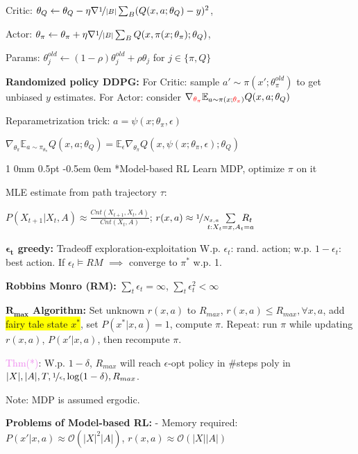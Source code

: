 \documentclass[11pt,landscape,a4paper,fleqn]{article}
\makeatletter
\newcommand*{\rsection}{%
	\@startsection{section}%
	{1}%
	{0mm}%
	{0.5pt}%
	{-0.5em \@plus 0em}
	{\color{myorange}\sffamily\small\bfseries}}
\newcommand{\mhl}[1]{\setlength{\fboxsep}{0pt}\colorbox{yellow}{#1}}
\makeatother
\begin{document}
\begin{multicols*}{4}
\iftrue
Critic: $\theta_Q \leftarrow \theta_Q - \eta \nabla \nicefrac{1}{|B|} \sum_B (Q(x,a;\theta_Q) - y)^2$,

Actor: $\theta_\pi  \leftarrow \theta_\pi + \eta \nabla \nicefrac{1}{|B|} \sum_B Q(x, \pi(x; \theta_\pi); \theta_Q)$,

Params: $\theta_j^{old} \leftarrow (1 - \rho) \theta_j^{old} + \rho \theta_j$ for $j \in \{\pi, Q \}$
\fi


\textbf{Randomized policy DDPG:} For Critic: sample $a' \sim \pi(x'; \theta_\pi^{old})$ to get unbiased $y$ estimates. For Actor: consider $\nabla_{\textcolor{red}{\theta_\pi}} \mathbb{E}_{a \sim \pi(x; \textcolor{red}{\theta_\pi})} Q(x,a;\theta_Q)$

Reparametrization trick: $a = \psi(x; \theta_\pi, \epsilon)$

$\nabla_{\theta_\pi} \mathbb{E}_{a \sim \pi_{\theta_\pi}} Q(x,a;\theta_Q) = \mathbb{E}_\epsilon \nabla_{\theta_\pi} Q(x, \psi(x; \theta_\pi, \epsilon); \theta_Q)$

\rsection*{Model-based RL} {\fontsize{9.5}{6}\selectfont Learn MDP, optimize $\pi$ on it}

MLE estimate from path trajectory $\tau$:

{\fontsize{9.7}{6}\selectfont $P(X_{t+1} | X_t, A) \approx \frac{Cnt(X_{t+1}, X_t, A)}{Cnt(X_t, A)}$;
$r(x,a) \approx \nicefrac{1}{N_{x,a}} \hspace*{-5mm} \sum\limits_{t: X_t = x, A_t = a} \hspace*{-5mm} R_t$}

\textbf{$\mathbf{\epsilon_t}$ greedy:} Tradeoff exploration-exploitation
W.p. $\epsilon_t$: rand. action; w.p. $1 - \epsilon_t$: best action.
If $\epsilon_t \vDash RM$ $\implies$ converge to $\pi^*$ w.p. 1.

\textbf{Robbins Monro (RM):} $\sum_t \epsilon_t = \infty$, $\sum_t \epsilon_t^2 < \infty$

\textbf{$\mathbf{R_{max}}$ Algorithm:} Set unknown $r(x,a)$ to $R_{max}$, $r(x,a) \leq R_{max}, \forall x,a$, add \mhl{fairy tale state $x^*$}, set $P(x^* | x,a) = 1$, compute $\pi$. Repeat: run $\pi$ while updating $r(x,a)$, $P(x' | x,a)$, then recompute $\pi$.

\textcolor{violet}{Thm(*)}: W.p. $1 - \delta$, $R_{max}$ will reach $\epsilon$-opt policy in \#steps poly in $|X|, |A|, T, \nicefrac{1}{\epsilon}, \log(1 - \delta), R_{max}$.

Note: MDP is assumed ergodic.

\textbf{Problems of Model-based RL:} - Memory required: $P(x'|x,a) \approx \mathcal{O}(|X|^2 |A|)$, $r(x,a) \approx \mathcal{O}(|X||A|)$


\end{multicols*}
\end{document}
